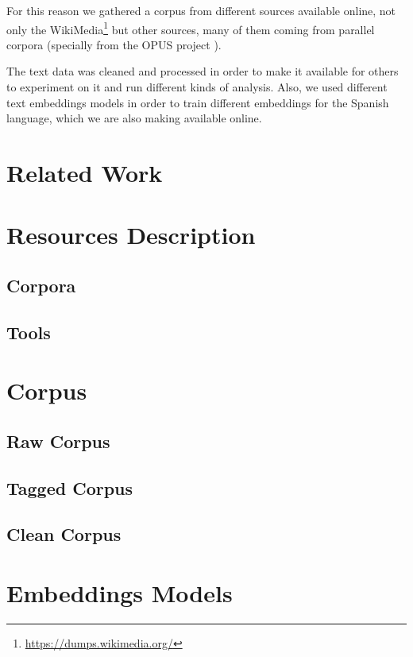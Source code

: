 \documentclass{article}
\begin{document}
For this reason we gathered a corpus from different sources available online,
not only the WikiMedia\footnote{\url{https://dumps.wikimedia.org/}} but other
sources, many of them coming from parallel corpora (specially from the OPUS
project \cite{TIEDEMANN12.463}).

The text data was cleaned and processed in order to make it available for
others to experiment on it and run different kinds of analysis. Also, we used
different text embeddings models in order to train different embeddings for the
Spanish language, which we are also making available online.

\section{Related Work}

\section{Resources Description}

\subsection{Corpora}

\subsection{Tools}

\section{Corpus}

\subsection{Raw Corpus}

\subsection{Tagged Corpus}

\subsection{Clean Corpus}

\section{Embeddings Models}
\end{document}
